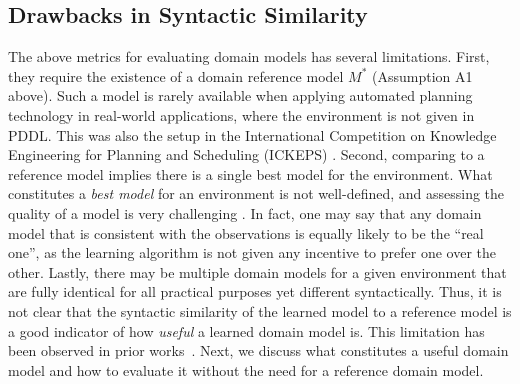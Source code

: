 \documentclass{article}
\theoremstyle{definition}
\theoremstyle{remark}
\newcommand{\realm}{{\ensuremath{M^*}}\xspace}
\newif\ifaddcomments
\newcommand{\roni}[1]{\ifaddcomments{\textcolor{red}{[Roni: #1]}}\fi}
\newcommand{\gregor}[1]{\ifaddcomments{\textcolor{orange}{[Gregor: #1]}}\fi}
\begin{document}
\subsection{Drawbacks in Syntactic Similarity}
The above metrics for evaluating domain models has several limitations. 
First, they require the existence of a domain reference model $\realm$ (Assumption A1 above). Such a model is rarely available when applying automated planning technology in real-world applications, where the environment is not given in PDDL. 
This was also the setup in the International Competition on Knowledge Engineering for Planning and Scheduling (ICKEPS) \citep{DBLP:journals/aim/ChrpaMVV17}. 
Second, comparing to a reference model implies there is a single best model for the environment. 
What constitutes a \emph{best model} for an environment is not well-defined, and assessing the quality of a model is very challenging \citep{DBLP:conf/kcap/McCluskeyVV17}. 
In fact, one may say that any domain model that is consistent with the observations is equally likely to be the ``real one'', as the learning algorithm is not given any incentive to prefer one over the other. \roni{@Pascal and Gregor: is this sentence capturing what you wrote about in the comment below?}
Lastly, there may be multiple domain models for a given environment that are fully identical for all practical purposes yet different syntactically. 
Thus, it is not clear that the syntactic similarity of the learned model to a reference model is a good indicator of how \emph{useful} a learned domain model is. This limitation has been observed in prior works~\citep{aineto2019learning,juba2021safe,mordoch2024safe}.
Next, we discuss what constitutes a useful domain model and how to evaluate it without the need for a reference domain model.


\end{document}
